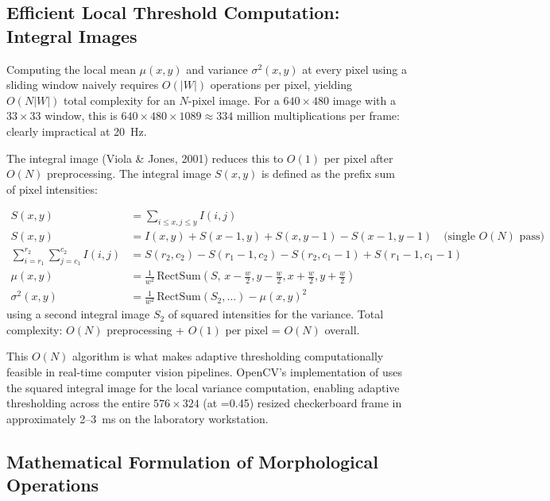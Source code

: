 \subsection{Efficient Local Threshold Computation: Integral Images}

Computing the local mean $\mu(x,y)$ and variance $\sigma^2(x,y)$ at every pixel using a sliding window naively requires $O(|W|)$ operations per pixel, yielding $O(N|W|)$ total complexity for an $N$-pixel image. For a $640\times480$ image with a $33\times33$ window, this is $640 \times 480 \times 1089 \approx 334$ million multiplications per frame: clearly impractical at 20~Hz.

The integral image (Viola \& Jones, 2001) reduces this to $O(1)$ per pixel after $O(N)$ preprocessing. The integral image $S(x,y)$ is defined as the prefix sum of pixel intensities:

\begin{eqblock}
\begin{align}
S(x,y) &= \sum_{i\leq x, j\leq y} I(i,j) \\
S(x,y) &= I(x,y) + S(x-1,y) + S(x,y-1) - S(x-1,y-1) \quad \text{(single $O(N)$ pass)} \\
\sum_{i=r_1}^{r_2}\sum_{j=c_1}^{c_2} I(i,j) &= S(r_2,c_2) - S(r_1{-}1,c_2) - S(r_2,c_1{-}1) + S(r_1{-}1,c_1{-}1) \\
\mu(x,y) &= \frac{1}{w^2}\,\text{RectSum}(S,\, x{-}\tfrac{w}{2}, y{-}\tfrac{w}{2}, x{+}\tfrac{w}{2}, y{+}\tfrac{w}{2}) \\
\sigma^2(x,y) &= \frac{1}{w^2}\,\text{RectSum}(S_2,\dots) - \mu(x,y)^2
\end{align}
using a second integral image $S_2$ of squared intensities for the variance. Total complexity: $O(N)$ preprocessing + $O(1)$ per pixel = $O(N)$ overall.
\end{eqblock}

This $O(N)$ algorithm is what makes adaptive thresholding computationally feasible in real-time computer vision pipelines. OpenCV's implementation of  uses the squared integral image for the local variance computation, enabling adaptive thresholding across the entire $576\times324$ (at =0.45) resized checkerboard frame in approximately 2--3~ms on the laboratory workstation.

\subsection{Mathematical Formulation of Morphological Operations}

